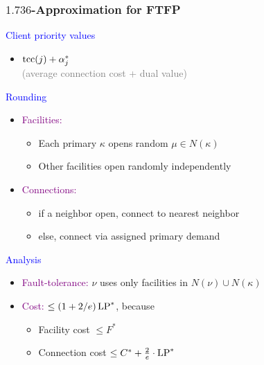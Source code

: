 \documentclass[hyperref,dvipsnames,svgnames]{beamer}
\begin{document}
\begin{frame}
  \frametitle{$1.736$-Approximation for FTFP} 

{\large

\textcolor{blue}{Client priority values}	
	
	\begin{itemize}
		\item $\mbox{\rm{tcc}}(j) + \alpha_j^\ast$ 
			\\
				{\normalsize \textcolor{gray}{(average connection cost + dual value)}}
	\end{itemize}

\textcolor{blue}{Rounding}

  	\begin{itemize}
  	  	\item  \textcolor{purple}{Facilities:} 
			\begin{itemize}
				\item Each primary $\kappa$ opens random $\mu\in N(\kappa)$
				\item Other facilities open randomly independently
			\end{itemize}
	  	\item \textcolor{purple}{Connections:} 
	 		\begin{itemize}
					\item if a neighbor open, connect to nearest neighbor
					\item else, connect via assigned primary demand
			\end{itemize}
  	\end{itemize}

\textcolor{blue}{Analysis}

  \begin{itemize}
  	\item \textcolor{purple}{Fault-tolerance:} $\nu$ uses only facilities in
    			$N(\nu) \cup N(\kappa)$
  	\item \textcolor{purple}{Cost:} $\le (1+2/e)\,\mbox{\rm LP}^\ast$, because
    	\begin{itemize}
    		\item Facility cost $\le F^\ast$
    		\item Connection cost $\le C^\ast + \frac{2}{e}\cdot \mbox{\rm LP}^\ast$
    	\end{itemize}
  \end{itemize}
}
\end{frame}

\end{document}
